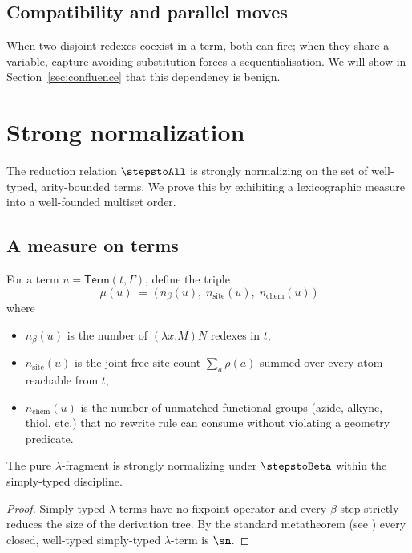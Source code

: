 \subsection{Compatibility and parallel moves}
When two disjoint redexes coexist in a term, both can fire; when they share a
variable, capture-avoiding substitution forces a sequentialisation. We will
show in Section~\ref{sec:confluence} that this dependency is benign.

\section{Strong normalization}
\label{sec:sn}
The reduction relation $\stepstoAll$ is strongly normalizing on the set of
well-typed, arity-bounded terms. We prove this by exhibiting a
lexicographic measure into a well-founded multiset order.

\subsection{A measure on terms}

\begin{definition}
\label{def:measure}
For a term $u = \mathsf{Term}(t,\Gamma)$, define the triple
\[
  \mu(u) \;=\; \bigl(\, n_\beta(u),\; n_{\text{site}}(u),\; n_{\text{chem}}(u) \,\bigr)
\]
where
\begin{itemize}
  \item $n_\beta(u)$ is the number of $(\lambda x.M)N$ redexes in $t$,
  \item $n_{\text{site}}(u)$ is the joint free-site count
        $\sum_a \rho(a)$ summed over every atom reachable from $t$,
  \item $n_{\text{chem}}(u)$ is the number of unmatched functional groups
        (azide, alkyne, thiol, etc.) that no rewrite rule can consume
        without violating a geometry predicate.
\end{itemize}
\end{definition}

\begin{lemma}
\label{lem:beta-sn}
The pure $\lambda$-fragment is strongly normalizing under $\stepstoBeta$
within the simply-typed discipline.
\end{lemma}
\begin{proof}
Simply-typed $\lambda$-terms have no fixpoint operator and every $\beta$-step
strictly reduces the size of the derivation tree. By the standard
metatheorem (see \cite[Chapter~6]{Pierce2002}) every closed, well-typed
simply-typed $\lambda$-term is $\sn$.
\end{proof}

